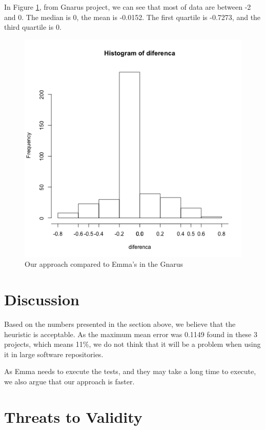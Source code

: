 \documentclass{sig-alternate}
\begin{document}
In Figure \ref{fig:gnarus}, from Gnarus project, we can see that most of data
are between -2 and 0. The median is 0, the mean is -0.0152. The first quartile
is -0.7273, and the third quartile is 0.

\begin{figure}[h!H]
  \centering
  \includegraphics[scale=0.5]{imgs/gnarus-histograma.png}
  \caption{Our approach compared to Emma's in the Gnarus}
  \label{fig:gnarus}
\end{figure}

\section{Discussion}

Based on the numbers presented in the section above, we believe that the heuristic
is acceptable. As the maximum mean error was 0.1149 found in these 3 projects, which means 11\%, 
we do not think that it will be a problem when using it in large software repositories.


As Emma needs to execute the tests, and they may take a long time to execute, we also argue
that our approach is faster.

\section{Threats to Validity}
\end{document}
